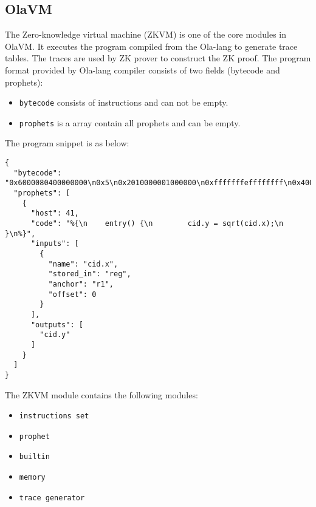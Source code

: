 \subsection{OlaVM} \label{sec:ola-vm}

The Zero-knowledge virtual machine (ZKVM) is one of the core modules in OlaVM. It executes the program compiled from the Ola-lang to generate trace tables. The traces are used by ZK prover to construct the ZK proof.
The program format provided by Ola-lang compiler consists of two fields (bytecode and prophets):
\begin{itemize}
    \item \verb|bytecode| consists of instructions and can not be empty.
    \item \verb|prophets| is a array contain all prophets and can be empty.
\end{itemize}

The program snippet is as below:
\begin{lstlisting}[label={lst:program-demo}]
{
  "bytecode": "0x6000080400000000\n0x5\n0x2010000001000000\n0xfffffffeffffffff\n0x4000000840000000\n0x0\n0x0030000001000000\n",
  "prophets": [
    {
      "host": 41,
      "code": "%{\n    entry() {\n        cid.y = sqrt(cid.x);\n    }\n%}",
      "inputs": [
        {
          "name": "cid.x",
          "stored_in": "reg",
          "anchor": "r1",
          "offset": 0
        }
      ],
      "outputs": [
        "cid.y"
      ]
    }
  ]
}
\end{lstlisting}


The ZKVM module contains the following modules:
\begin{itemize}
    \item \verb|instructions set|
    \item \verb|prophet|
    \item \verb|builtin|
    \item \verb|memory|
    \item \verb|trace generator|
\end{itemize}





